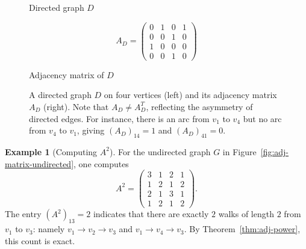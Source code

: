 \documentclass[12pt,a4paper]{article}
\theoremstyle{definition}
\newtheorem{example}{Example}[section]
\theoremstyle{plain}
\theoremstyle{remark}
\begin{document}
\begin{figure}[htbp]
  \centering
  \begin{minipage}{0.45\textwidth}
    \centering
    \par\vspace{4pt}
    {\small Directed graph $D$}
  \end{minipage}
  \hfill
  \begin{minipage}{0.45\textwidth}
    \centering
    \[
      A_D =
      \begin{pmatrix}
        0 & 1 & 0 & 1 \\
        0 & 0 & 1 & 0 \\
        1 & 0 & 0 & 0 \\
        0 & 0 & 1 & 0
      \end{pmatrix}
    \]
    \par\vspace{4pt}
    {\small Adjacency matrix of $D$}
  \end{minipage}
  \caption{A directed graph $D$ on four vertices (left) and its adjacency matrix $A_D$
           (right). Note that $A_D \neq A_D^T$, reflecting the asymmetry of directed
           edges. For instance, there is an arc from $v_1$ to $v_4$ but no arc from
           $v_4$ to $v_1$, giving $(A_D)_{14} = 1$ and $(A_D)_{41} = 0$.}
  \label{fig:adj-matrix-directed}
\end{figure}

\begin{example}[Computing $A^2$]\label{ex:A-squared}
For the undirected graph $G$ in Figure~\ref{fig:adj-matrix-undirected}, one computes
\begin{equation}
  A^2 =
  \begin{pmatrix}
    3 & 1 & 2 & 1 \\
    1 & 2 & 1 & 2 \\
    2 & 1 & 3 & 1 \\
    1 & 2 & 1 & 2
  \end{pmatrix}.
\end{equation}
The entry $(A^2)_{13} = 2$ indicates that there are exactly $2$ walks of length $2$
from $v_1$ to $v_3$: namely $v_1 \to v_2 \to v_3$ and $v_1 \to v_4 \to v_3$.
By Theorem~\ref{thm:adj-power}, this count is exact.
\end{example}
\end{document}
